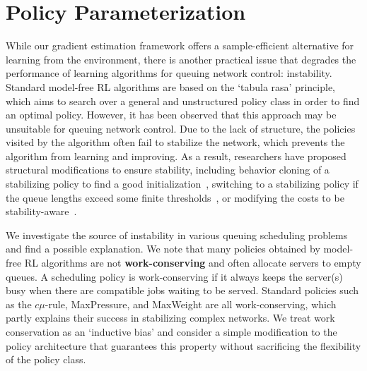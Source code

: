 

\section{Policy Parameterization}
\label{section:optimization}

While our gradient estimation framework 
offers a sample-efficient alternative for 
learning from the environment, there is another practical 
issue that degrades the performance of learning algorithms for 
queuing network control: instability. Standard model-free RL algorithms are based on the `tabula rasa' principle, which aims to search over a general and unstructured policy class in order to find an optimal policy. However, it has been observed that this approach may be unsuitable for queuing network control. Due to the lack of structure, the policies visited by the algorithm often fail to stabilize the network,
which prevents the algorithm from learning and improving.
As a result, researchers have proposed structural modifications to ensure stability, 
including behavior cloning of a stabilizing policy to find a good initialization~\cite{dai2022queueing}, 
switching to a stabilizing policy 
if the queue lengths exceed some finite thresholds~\cite{liu2022rl}, 
or modifying the costs to be stability-aware~\cite{pavse2024learning}. 

We investigate the source of instability in various queuing scheduling problems and find a possible explanation. 
We note that many policies obtained by model-free RL algorithms are not {\bf work-conserving} and often allocate servers to empty queues. A scheduling policy is work-conserving if it always keeps the server(s) busy when there are compatible jobs waiting to be served.
Standard policies such as the $c\mu$-rule, MaxPressure, and MaxWeight are all work-conserving, which partly explains their success in stabilizing complex networks. We treat work conservation as an `inductive bias'
and consider a simple modification to the policy architecture that guarantees this property without sacrificing the flexibility of the policy class. 

